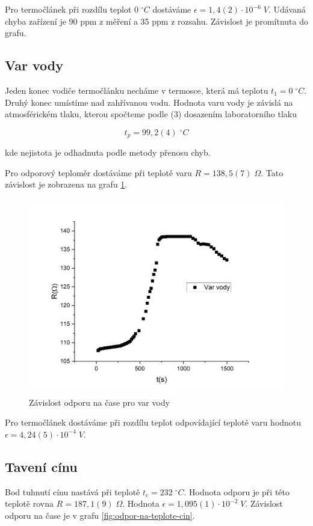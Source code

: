 Pro termočlánek při rozdílu teplot $0 \; ^\circ C$ dostáváme $\epsilon = 1,4(2) \cdot 10^{-6} \; V$. Udávaná chyba zařízení je 90 ppm z měření a 35 ppm z rozsahu. Závislost je promítnuta do grafu.




\subsection{Var vody}

Jeden konec vodiče termočlánku necháme v termosce, která má teplotu $t_1 = 0 \; ^\circ C$. Druhý konec umístíme nad zahřívanou vodu. Hodnota varu vody je závislá na atmosférickém tlaku, kterou spočteme podle (3) dosazením laboratorního tlaku

\begin{equation}
    \nonumber
    t_p = 99,2(4) \; ^\circ C
\end{equation}

kde nejistota je odhadnuta podle metody přenosu chyb.

Pro odporový teploměr dostáváme při teplotě varu $R = 138,5(7) \; \Omega$. Tato závislost je zobrazena na grafu \ref{fig:odpor-na-teplote-var}.

\begin{figure}[h]
    \centering
    \includegraphics[width=0.5\linewidth]{8 - Kalibrace odporového teploměru a termočlánku//Prototkol - kalibrace teploměru//img/Závislost R na t, var vody.png}
    \caption{Závislost odporu na čase pro var vody}
    \label{fig:odpor-na-teplote-var}
\end{figure}

Pro termočlánek dostáváme při rozdílu teplot odpovídající teplotě varu hodnotu $\epsilon = 4,24(5) \cdot 10^{-4} \; V$.

\newpage
\subsection{Tavení cínu}

Bod tuhnutí cínu nastává při teplotě $t_c = 232 \; ^\circ C$. Hodnota odporu je při této teplotě rovna $R = 187,1(9) \; \Omega$. Hodnota $\epsilon = 1,095(1) \cdot 10^{-2} \; V$. Závislost odporu na čase je v grafu \ref{fig:odpor-na-teplote-cin}.

